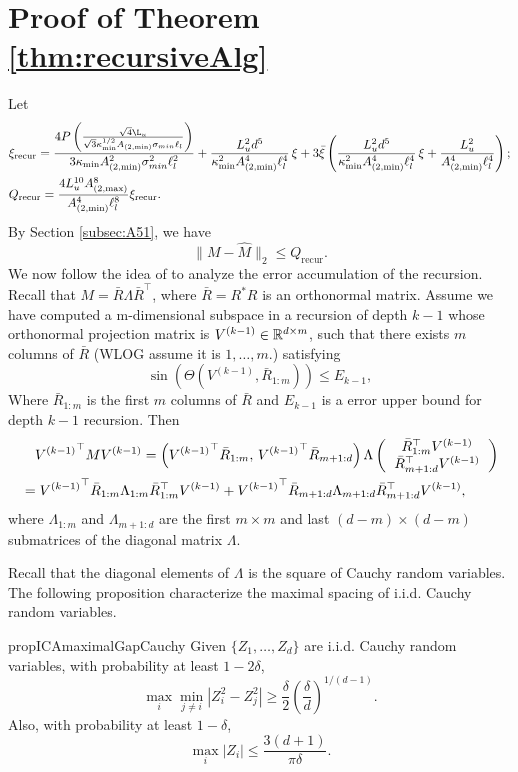 \section{Proof of Theorem \ref{thm:recursiveAlg}}
Let 
\begin{align*}
&\xi_{\text{recur}} = \frac{4P\left(\frac{\sqrt{4}\L_u}{\sqrt{3}\kappa_{\min}^{1/2}A_{(2,\min)}\sigma_{min}\ell_l}\right)}{3\kappa_{\min}A^2_{(2,\min)}\sigma^2_{min}\ell^2_l} + \frac{L_u^2d^5}{\kappa^{2}_{\min}A^4_{(2,\min)}\ell^4_l}\,\xi  + 3\bar{\xi}\left(\frac{L_u^2d^5}{\kappa^{2}_{\min}A^4_{(2,\min)}\ell^4_l}\,\xi + \frac{L_u^2}{A^4_{(2,\min)}\ell_l^4} \right);\\
& Q_{\text{recur}} = \frac{4L_u^{10}A^8_{(2,\max)}}{A^4_{(2,\min)}\ell_l^8}\xi_{\text{recur}}.
\end{align*}
By Section \ref{subsec:A51}, we have
\[
\|M-\hat{M}\|_2 \le Q_{\text{recur}}.
\]
We now follow the idea of \citet{vempala2014max} to analyze the error accumulation of the recursion.
Recall that $M = \bar{R}\Lambda\bar{R}^{\top}$, where $\bar{R} = R^*R$ is an orthonormal matrix.
Assume we have computed a m-dimensional subspace in a recursion of depth $k-1$ whose orthonormal projection matrix is $V^{(k-1)} \in \mathbb{R}^{d\times m}$, such that there exists $m$ columns of $\bar{R}$ (WLOG assume it is $1,\ldots,m$.) satisfying
\[
\sin\left(\Theta\left(V^{(k-1)}, \bar{R}_{1:m}\right)\right) \le E_{k-1},
\] 
Where $\bar{R}_{1:m}$ is the first $m$ columns of $\bar{R}$ and $E_{k-1}$ is a error upper bound for depth $k-1$ recursion.
Then
\begin{align*}
& \quad {V^{(k-1)}}^\top MV^{(k-1)} = \left( {V^{(k-1)}}^\top\bar{R}_{1:m},\, {V^{(k-1)}}^\top\bar{R}_{m+1:d}\right)\Lambda
\left(
\begin{tabular}{c}
$\bar{R}_{1:m}^{\top} V^{(k-1)}$ \\
$\bar{R}_{m+1:d}^{\top} V^{(k-1)}$
\end{tabular}
\right) \\
& = {V^{(k-1)}}^\top\bar{R}_{1:m}\Lambda_{1:m} \bar{R}_{1:m}^{\top} V^{(k-1)} + {V^{(k-1)}}^\top\bar{R}_{m+1:d}\Lambda_{m+1:d}\bar{R}_{m+1:d}^{\top} V^{(k-1)},
\end{align*}
where $\Lambda_{1:m}$ and $\Lambda_{m+1:d}$ are the first $m\times m$  and last $(d-m)\times (d-m)$ submatrices of the diagonal matrix $\Lambda$.

Recall that the diagonal elements of $\Lambda$ is the square of Cauchy random variables. The following proposition characterize the maximal spacing of i.i.d. Cauchy random variables.
\begin{restatable}{prop}{ICAmaximalGapCauchy}
	\label{prop:maximalGapCauchy}
	Given $\{Z_1,\ldots, Z_d\}$ are i.i.d. Cauchy random variables, with probability at least $1-2\delta$, 
	\[
	\max_i \min_{j\neq i} |Z_i^2 - Z_j^2| \ge \frac{\delta}{2}\left(\frac{\delta}{d}\right)^{1/(d-1)}. %
	\]
	Also, with probability at least $1-\delta$,
	\[
	\max_i |Z_i| \le \frac{3(d+1)}{\pi\delta}.
	\]
\end{restatable}

